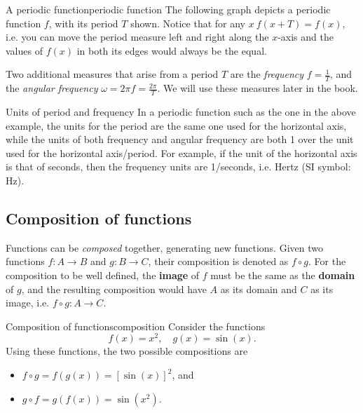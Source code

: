 \begin{example}{A periodic function}{periodic function}
	The following graph depicts a periodic function $f$, with its period $T$ shown. Notice that for any $x\ f(x+T)=f(x)$, i.e. you can move the period measure left and right along the $x$-axis and the values of $f(x)$ in both its edges would always be the equal.

	\centering
\end{example}

Two additional measures that arise from a period $T$ are the \emph{frequency} $f=\frac{1}{T}$, and the \emph{angular frequency} $\omega=2\pi f=\frac{2\pi}{T}$. We will use these measures later in the book.

\vspace{2em}
\begin{note}{Units of period and frequency}{}
	In a periodic function such as the one in the above example, the units for the period are the same one used for the horizontal axis, while the units of both frequency and angular frequency are both 1 over the unit used for the horizontal axis/period. For example, if the unit of the horizontal axis is that of seconds, then the frequency units are 1/seconds, i.e. Hertz (SI symbol: \si{Hz}).
\end{note}

\subsection{Composition of functions}
Functions can be \emph{composed} together, generating new functions. Given two functions $f:A\to B$ and $g:B\to C$, their composition is denoted as $f\circ g$. For the composition to be well defined, the \textbf{image} of $f$ must be the same as the \textbf{domain} of $g$, and the resulting composition would have $A$ as its domain and $C$ as its image, i.e. $f\circ g:A\to C$.

\begin{example}{Composition of functions}{composition}
	Consider the functions
	\[
		f(x)=x^{2},\quad g(x)=\sin(x).
	\]
	Using these functions, the two possible compositions are
	\begin{itemize}
		\item $f\circ g = f\left( g(x) \right) = \left[ \sin(x) \right]^{2}$, and
		\item $g\circ f = g\left( f(x) \right) = \sin\left( x^{2} \right)$.
	\end{itemize}
\end{example}

